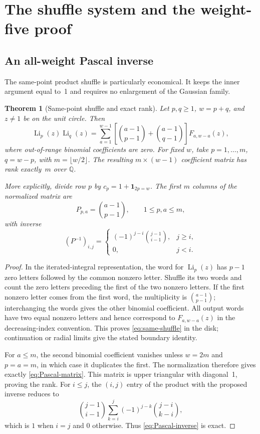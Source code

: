 \documentclass[11pt,a4paper]{article}
\numberwithin{equation}{section}
\newtheorem{theorem}{Theorem}[section]
\theoremstyle{definition}
\theoremstyle{remark}
\newcommand{\Li}{\operatorname{Li}}
\begin{document}
\section{The shuffle system and the weight-five proof}
\label{sec:shuffle}

\subsection{An all-weight Pascal inverse}
The same-point product shuffle is particularly economical. It keeps the inner argument equal to~1 and requires no enlargement of the Gaussian family.

\begin{theorem}[Same-point shuffle and exact rank]\label{thm:shuffle-rank}
Let $p,q\ge1$, $w=p+q$, and $z\ne1$ be on the unit circle. Then
\begin{equation}\label{eq:same-shuffle}
 \Li_p(z)\Li_q(z)
 =\sum_{a=1}^{w-1}
 \left[\binom{a-1}{p-1}+\binom{a-1}{q-1}\right]F_{a,w-a}(z),
\end{equation}
where out-of-range binomial coefficients are zero.
For fixed $w$, take $p=1,\ldots,m$, $q=w-p$, with $m=\lfloor w/2\rfloor$.
The resulting $m\times(w-1)$ coefficient matrix has rank exactly~$m$ over $\mathbb Q$.

More explicitly, divide row $p$ by $c_p=1+\mathbf1_{2p=w}$. The first $m$ columns of the normalized matrix are
\begin{equation}\label{eq:Pascal-matrix}
 P_{p,a}=\binom{a-1}{p-1},\qquad 1\le p,a\le m,
\end{equation}
with inverse
\begin{equation}\label{eq:Pascal-inverse}
 (P^{-1})_{i,j}=\begin{cases}
 (-1)^{j-i}\binom{j-1}{i-1},&j\ge i,\\
 0,&j<i.
 \end{cases}
\end{equation}
\end{theorem}
\begin{proof}
In the iterated-integral representation, the word for $\Li_p(z)$ has $p-1$ zero letters followed by the common nonzero letter. Shuffle its two words and count the zero letters preceding the first of the two nonzero letters. If the first nonzero letter comes from the first word, the multiplicity is $\binom{a-1}{p-1}$; interchanging the words gives the other binomial coefficient. All output words have two equal nonzero letters and hence correspond to $F_{a,w-a}(z)$ in the decreasing-index convention. This proves \eqref{eq:same-shuffle} in the disk; continuation or radial limits give the stated boundary identity.

For $a\le m$, the second binomial coefficient vanishes unless $w=2m$ and $p=a=m$, in which case it duplicates the first. The normalization therefore gives exactly \eqref{eq:Pascal-matrix}. This matrix is upper triangular with diagonal~1, proving the rank. For $i\le j$, the $(i,j)$ entry of the product with the proposed inverse reduces to
\[
 \binom{j-1}{i-1}\sum_{k=i}^j(-1)^{j-k}\binom{j-i}{k-i},
\]
which is $1$ when $i=j$ and $0$ otherwise. Thus \eqref{eq:Pascal-inverse} is exact.
\end{proof}
\end{document}
